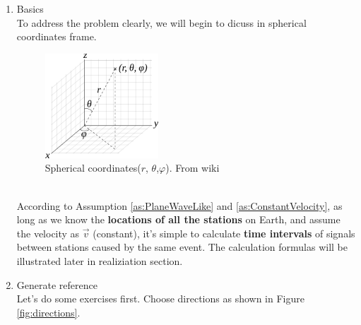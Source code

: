 \documentclass[
12pt, %
a4paper %
]{extreport}
\theoremstyle{plain}
\begin{document}
\begin{enumerate} %
\item Basics\\
To address the problem clearly, we will begin to dicuss in spherical coordinates frame. \\
\begin{figure}[h]
	\begin{center}
	\includegraphics[width=0.4\textwidth]{spherical_frame.png}
	\end{center}
	\caption{Spherical coordinates($r$, $\theta$,$\varphi$). From wiki}
\end{figure}\\
According to Assumption \ref{as:PlaneWaveLike} and \ref{as:ConstantVelocity}, as long as we know the \textbf{locations of all the stations} on Earth, and assume the velocity as $\vec{v}$ (constant), it’s simple to calculate \textbf{time intervals} of signals between stations caused by the same event. The calculation formulas will be illustrated later in realiziation section.
\item Generate reference\\
Let's do some exercises first. Choose directions as shown in Figure \ref{fig:directions}. 
\begin{figure}[htbp]
\centering
{}
\quad
{}
\end{figure}
\end{enumerate}
\end{document}
